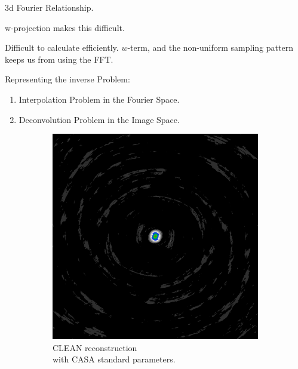 3d Fourier Relationship.

w-projection makes this difficult.

Difficult to calculate efficiently. $w$-term, and the non-uniform sampling pattern keeps us from using the FFT.

Representing the inverse Problem:
\begin{enumerate}
	\item Interpolation Problem in the Fourier Space.
	\item Deconvolution Problem in the Image Space.
\end{enumerate}


\begin{figure}[h]
	\centering
	\begin{subfigure}[b]{0.3\linewidth}
		\includegraphics[width=\linewidth]{./chapters/01.intro/mk2/psf.png}
		\caption{CLEAN reconstruction \\with CASA standard parameters.}
		\label{results:points:tclean}
	\end{subfigure}
	\begin{subfigure}[b]{0.3\linewidth}

\end{subfigure}
\end{figure}
